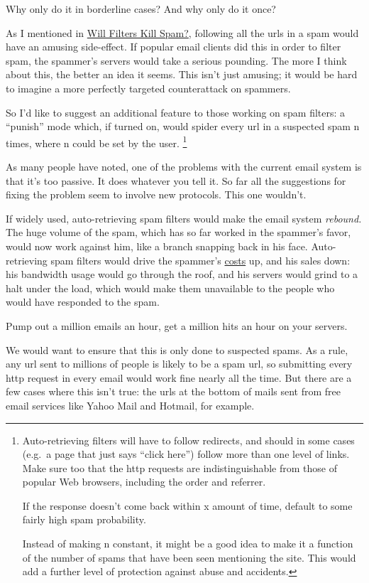 \documentclass[12pt]{book}
\begin{document}
Why only do it in borderline cases? And why only do it once?

As I mentioned in \href{wfks.html}{Will Filters Kill Spam?}, following
all the urls in a spam would have an amusing side-effect. If popular
email clients did this in order to filter spam, the spammer's servers
would take a serious pounding. The more I think about this, the better
an idea it seems. This isn't just amusing; it would be hard to imagine a
more perfectly targeted counterattack on spammers.

So I'd like to suggest an additional feature to those working on spam
filters: a ``punish'' mode which, if turned on, would spider every url
in a suspected spam n times, where n could be set by the user. \footnote{Auto-retrieving filters will have to follow redirects, and
should in some cases (e.g.~a page that just says ``click here'') follow
more than one level of links. Make sure too that the http requests are
indistinguishable from those of popular Web browsers, including the
order and referrer.

If the response doesn't come back within x amount of time, default to
some fairly high spam probability.

Instead of making n constant, it might be a good idea to make it a
function of the number of spams that have been seen mentioning the site.
This would add a further level of protection against abuse and
accidents.}

As many people have noted, one of the problems with the current email
system is that it's too passive. It does whatever you tell it. So far
all the suggestions for fixing the problem seem to involve new
protocols. This one wouldn't.

If widely used, auto-retrieving spam filters would make the email system
\emph{rebound.} The huge volume of the spam, which has so far worked in
the spammer's favor, would now work against him, like a branch snapping
back in his face. Auto-retrieving spam filters would drive the spammer's
\href{http://www.bork.ca/pics/?path=incoming&img=bill.jpg}{costs} up,
and his sales down: his bandwidth usage would go through the roof, and
his servers would grind to a halt under the load, which would make them
unavailable to the people who would have responded to the spam.

Pump out a million emails an hour, get a million hits an hour on your
servers.

We would want to ensure that this is only done to suspected spams. As a
rule, any url sent to millions of people is likely to be a spam url, so
submitting every http request in every email would work fine nearly all
the time. But there are a few cases where this isn't true: the urls at
the bottom of mails sent from free email services like Yahoo Mail and
Hotmail, for example.
\end{document}
